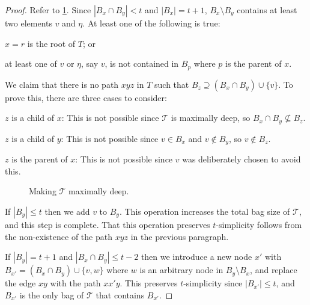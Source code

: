 \documentclass[kpfonts]{patmorin}
\theoremstyle{named}
\begin{document}
\begin{proof}
    Refer to \cref{tough-one}.
    Since $|B_x\cap B_y|< t$ and $|B_x|=t+1$, $B_x\setminus B_y$ contains at least two elements $v$ and $\eta$.  At least one of the following is true:
    \begin{inparaenum}[(i)]
        \item $x=r$ is the root of $T$; or
        \item at least one of $v$ or $\eta$, say $v$, is not contained in $B_p$ where $p$ is the parent of $x$.
    \end{inparaenum}
    We claim that there is no path $xyz$ in $T$ such that $B_z\supseteq (B_x\cap B_y)\cup\{v\}$. To prove this, there are three cases to consider:
    \begin{compactenum}
        \item $z$ is a child of $x$:  This is not possible since $\mathcal{T}$ is maximally deep, so $B_x\cap B_y\not\subseteq B_z$.
        \item $z$ is a child of $y$:  This is not possible since $v\in B_x$ and $v\not\in B_y$, so $v\not\in B_z$.
        \item $z$ is the parent of $x$:  This is not possible since $v$ was deliberately chosen to avoid this.
    \end{compactenum}
    \begin{figure}
        \caption{Making $\mathcal{T}$ maximally deep.}
        \label{tough-one}
    \end{figure}


    If $|B_y|\le t$ then we add $v$ to $B_y$.  This operation increases the total bag size of $\mathcal{T}$, and this step is complete.  That this operation preserves $t$-simplicity follows from the non-existence of the path $xyz$ in the previous paragraph.

    If $|B_y|=t+1$ and $|B_x\cap B_y|\le t-2$ then we introduce a new node $x'$ with $B_{x'}=(B_x\cap B_y)\cup\{v,w\}$ where $w$ is an arbitrary node in $B_y\setminus B_x$, and replace the edge $xy$ with the path $xx'y$.  This preserves $t$-simplicity since $|B_{x'}|\le t$, and $B_{x'}$ is the only bag of $\mathcal{T}$ that contains $B_{x'}$.


\end{proof}
\end{document}
